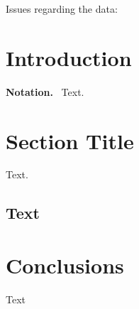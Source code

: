 \documentclass[graybox]{svmult}
\newcommand{\mypar}[1]{\bigskip\noindent\textbf{#1.}~}
\begin{document}
Issues regarding the data:

%



\section{Introduction}
\label{sec:Introduction}




\mypar{Notation}
Text. 


\section{Section Title}
\label{sec:AStarAlgorithm}

Text.

\subsection{Text}
\label{sec:Formalizing}



\section{Conclusions}
\label{sec:Conclusions}

Text

\printbibliography
%
%
\end{document}
